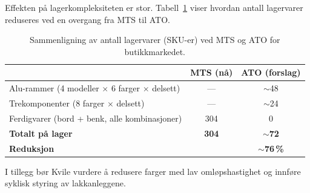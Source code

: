 Effekten på lagerkompleksiteten er stor. Tabell~\ref{tab:ato-sammenligning} viser hvordan antall lagervarer reduseres ved en overgang fra MTS til ATO.

\begin{table}[htbp]
    \centering
    \caption[MTS vs.\ ATO lagervarer]{Sammenligning av antall lagervarer (SKU-er) ved MTS og ATO for butikkmarkedet.}
    \label{tab:ato-sammenligning}
    \small
    \begin{tabular}{@{}lcc@{}}
        \toprule
        & \textbf{MTS (nå)} & \textbf{ATO (forslag)} \\
        \midrule
        Alu-rammer (4 modeller $\times$ 6 farger $\times$ delsett)
            & --- & $\sim$48 \\
        Trekomponenter (8 farger $\times$ delsett)
            & --- & $\sim$24 \\
        Ferdigvarer (bord + benk, alle kombinasjoner)
            & 304 & 0 \\
        \midrule
        \textbf{Totalt på lager} & \textbf{304} & $\mathbf{\sim}$\textbf{72} \\
        \textbf{Reduksjon} & & \textbf{$\sim$76\,\%} \\
        \bottomrule
    \end{tabular}
\end{table}

I tillegg bør Kvile vurdere å redusere farger med lav omløpshastighet og innføre syklisk styring av lakkanleggene.



